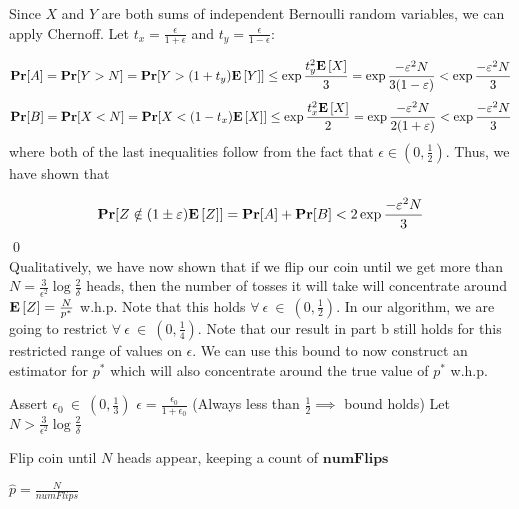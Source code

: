 \documentclass[12pt]{article}
\begin{document}
\begin{solution}
\begin{solution}
Since $X$ and $Y$ are both sums of independent Bernoulli random variables, we can apply Chernoff. Let $t_x = \frac{\epsilon}{1 + \epsilon}$ and $t_y = \frac{\epsilon}{1 - \epsilon}$:

\[
\textbf{Pr}[A] = \textbf{Pr}[Y > N] = \textbf{Pr}[Y > (1+t_y)\mathbf{E}\left[Y\right]] \leq \exp{\frac{t_{y}^2\mathbf{E}\left[X\right]}{3}} = \exp{{\frac{-\varepsilon^2N}{3(1 -\varepsilon)}}} < \exp{{\frac{-\varepsilon^2N}{3}}}
\]
\[
\textbf{Pr}[B] = \textbf{Pr}[X <  N] = \textbf{Pr}[X < (1-t_x)\mathbf{E}\left[X\right]] \leq \exp{\frac{t_{x}^2\mathbf{E}\left[X\right]}{2}} = \exp{{\frac{-\varepsilon^2N}{2(1 + \varepsilon)}}} < \exp{{\frac{-\varepsilon^2N}{3}}}
\]
where both of the last inequalities follow from the fact that $\epsilon \in (0,\frac{1}{2})$. Thus, we have shown that 

\[
\textbf{Pr}[Z \notin (1 \pm \varepsilon)\mathbf{E}\left[Z\right]]=  \textbf{Pr}[A] + \textbf{Pr}[B] < 2\exp{{\frac{-\varepsilon^2N}{3}}}
\]
\qed\\
Qualitatively, we have now shown that if we flip our coin until we get more than $N=\frac{3}{\epsilon^2}\log{\frac{2}{\delta}} $ heads, then the number of tosses it will take will concentrate around $\mathbf{E}\left[Z\right] = \frac{N}{p^*}$ w.h.p. Note that this holds $\forall~\epsilon~\in~(0,\frac{1}{2})$. In our algorithm, we are going to restrict $\forall~\epsilon~\in~(0,\frac{1}{4})$. Note that our result in part b still holds for this restricted range of values on $\epsilon$. We can use this bound to now construct an estimator for $p^*$ which will also concentrate around the true value of $p^*$ w.h.p.

\begin{answerbox}
\begin{algorithmic}
\State Assert $\epsilon_0~\in~(0,\frac{1}{3})$
\State $\epsilon = \frac{\epsilon_0}{1 + \epsilon_0}$ (Always less than $\frac{1}{2} \implies$ bound holds)
\State Let $N > \frac{3}{\epsilon^2}\log{\frac{2}{\delta}}$

\State Flip coin until $N$ heads appear, keeping a count of $\textbf{numFlips}$

\State $\hat{p} = \frac{N}{numFlips}$

\State {}


\end{algorithmic}
\end{answerbox}
\end{solution}
\end{solution}
\end{document}
